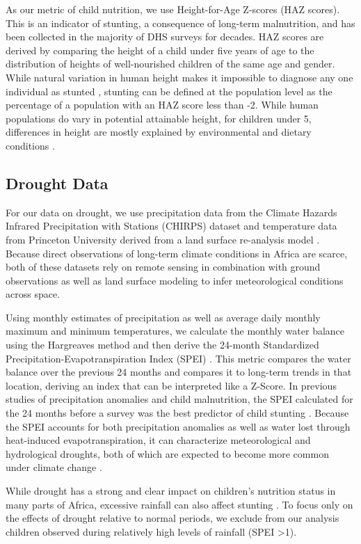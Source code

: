 \documentclass{article}
\begin{document}
As our metric of child nutrition, we use Height-for-Age Z-scores (HAZ scores).  This is an indicator of stunting, a consequence of long-term malnutrition, and has been collected in the majority of DHS surveys for decades.  HAZ scores are derived by comparing the height of a child under five years of age to the distribution of heights of well-nourished children of the same age and gender.  While natural variation in human height makes it impossible to diagnose any one individual as stunted \cite{Perumal2018}, stunting can be defined at the population level as the percentage of a population with an HAZ score less than -2.  While human populations do vary in potential attainable height, for children under 5, differences in height are mostly explained by environmental and dietary conditions \cite{Habicht1974}.

\subsection{Drought Data}
For our data on drought, we use precipitation data from the Climate Hazards Infrared Precipitation with Stations (CHIRPS) dataset \cite{Funk2015} and temperature data from Princeton University derived from a land surface re-analysis model \cite{Sheffield2006}.  Because direct observations of long-term climate conditions in Africa are scarce, both of these datasets rely on remote sensing in combination with ground observations as well as land surface modeling to infer meteorological conditions across space.

Using monthly estimates of precipitation as well as average daily monthly maximum and minimum temperatures, we calculate the monthly water balance using the Hargreaves method \cite{Hargreaves1982} and then derive the 24-month Standardized Precipitation-Evapotranspiration Index (SPEI) \cite{Begueria2014}.  This metric compares the water balance over the previous 24 months and compares it to long-term trends in that location, deriving an index that can be interpreted like a Z-Score.  In previous studies of precipitation anomalies and child malnutrition, the SPEI calculated for the 24 months before a survey was the best predictor of child stunting \cite{Cooper2019a}.  Because the SPEI accounts for both precipitation anomalies as well as water lost through heat-induced evapotranspiration, it can characterize meteorological and hydrological droughts, both of which are expected to become more common under climate change \cite{Dai2013}.

While drought has a strong and clear impact on children's nutrition status in many parts of Africa, excessive rainfall can also affect stunting \cite{Cooper2019a, dimitrova2020monsoon}.  To focus only on the effects of drought relative to normal periods, we exclude from our analysis children observed during relatively high levels of rainfall (SPEI \textgreater 1).
\end{document}
